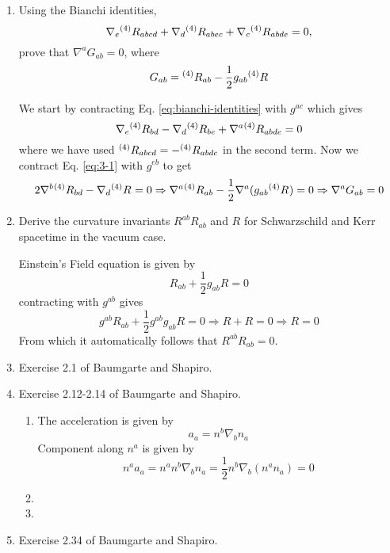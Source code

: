\documentclass[10pt]{article}
\begin{document}
\begin{enumerate}
\item Using the Bianchi identities,
  \begin{equation}
    \label{eq:bianchi-identities}
    \nabla_e{}^{(4)}R_{abcd} + \nabla_d{}^{(4)}R_{abec} + \nabla_c{}^{(4)}R_{abde} = 0,
  \end{equation}
  prove that $\nabla^aG_{ab} = 0$, where
  \begin{equation}
    \label{eq:Gab}
    G_{ab} = {}^{(4)}R_{ab} - \frac{1}{2}g_{ab} {}^{(4)}R_{}
  \end{equation}

  We start by contracting Eq. \eqref{eq:bianchi-identities} with $g^{ac}$ which gives
  \begin{equation}
    \label{eq:3-1}
    \nabla_{e}{}^{(4)}R_{bd} - \nabla_d {}^{(4)}R_{be} + \nabla^a{}^{(4)}R_{abde} = 0
  \end{equation}
  where we have used ${}^{(4)}R_{abcd} = - {}^{(4)}R_{abdc}$ in the second term. Now we contract Eq. \eqref{eq:3-1} with $g^{eb}$ to get
  \begin{equation}
    \label{eq:}
    2 \nabla^b {}^{(4)}R_{bd} - \nabla_d {}^{(4)}R_{} = 0 \Rightarrow \nabla^a{}^{(4)}R_{ab} - \frac{1}{2} \nabla^a (g_{ab}{}^{(4)}R_{}) = 0 \Rightarrow \nabla^a G_{ab} = 0
  \end{equation}

\item Derive the curvature invariants $R^{ab}R_{ab}$ and $R$ for Schwarzschild and Kerr spacetime in the vacuum case.

  Einstein's Field equation is given by
  \begin{equation}
    \label{eq:EFE}
    R_{ab} + \frac{1}{2} g_{ab}R = 0
  \end{equation}
  contracting with $g^{ab}$ gives
  \begin{equation}
    \label{eq:}
    g^{ab}R_{ab} + \frac{1}{2} g^{ab}g_{ab}R = 0 \Rightarrow R + R = 0 \Rightarrow R = 0
  \end{equation}
  From which it automatically follows that $R^{ab}R_{ab} = 0$.

\item Exercise 2.1 of Baumgarte and Shapiro.
\item Exercise 2.12-2.14 of Baumgarte and Shapiro.
  \begin{enumerate}
  \item The acceleration is given by
    \begin{equation}
      \label{eq:acceleration}
      a_a = n^b \nabla_b n_a
    \end{equation}
    Component along $n^a$ is given by
    \begin{equation}
      \label{eq:projection-along-na}
      n^aa_a = n^a n^b \nabla_b n_a = \frac{1}{2}  n^b \nabla_b(n^an_a) = 0
    \end{equation}

  \item
  \item 
  \end{enumerate}
  
\item Exercise 2.34 of Baumgarte and Shapiro.
\end{enumerate}
\end{document}
